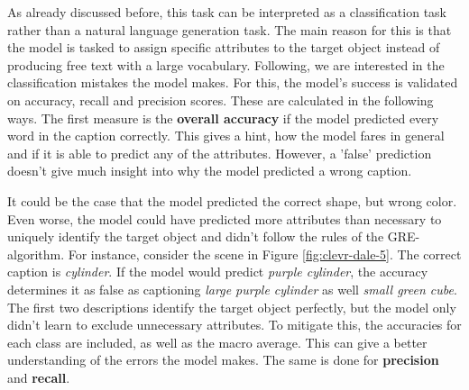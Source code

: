 As already discussed before, this task can be interpreted as a classification task rather than a natural language generation task.
The main reason for this is that the model is tasked to assign specific attributes to the target object instead of producing free text with a large vocabulary.
Following, we are interested in the classification mistakes the model makes.
For this, the model's success is validated on accuracy, recall and precision scores.
These are calculated in the following ways.
The first measure is the \textbf{overall accuracy} if the model predicted every word in the caption correctly.
This gives a hint, how the model fares in general and if it is able to predict any of the attributes.
However, a 'false' prediction doesn't give much insight into why the model predicted a wrong caption.

It could be the case that the model predicted the correct shape, but wrong color.
Even worse, the model could have predicted more attributes than necessary to uniquely identify the target object and didn't follow the rules of the GRE-algorithm.
For instance, consider the scene in Figure \ref{fig:clevr-dale-5}.
The correct caption is \emph{cylinder}.
If the model would predict \emph{purple cylinder}, the accuracy determines it as false as captioning \emph{large purple cylinder} as well \emph{small green cube}.
The first two descriptions identify the target object perfectly, but the model only didn't learn to exclude unnecessary attributes.
To mitigate this, the accuracies for each class are included, as well as the macro average.
This can give a better understanding of the errors the model makes.
The same is done for \textbf{precision} and \textbf{recall}.

